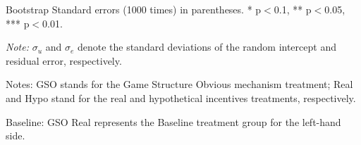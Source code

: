 \documentclass[12pt]{article}
\begin{document}
\begin{table}[H]
\begin{tablenotes}
            \footnotesize
            \item Bootstrap Standard errors (1000 times) in parentheses. * p$<$0.1, ** p$<$0.05, *** p$<$0.01.
            \item \textit{Note:} $\sigma_u$ and $\sigma_e$ denote the standard deviations of the random intercept and residual error, respectively.
            \item Notes: GSO stands for the Game Structure Obvious mechanism treatment; Real and Hypo stand for the real and hypothetical incentives treatments, respectively.
           \item Baseline: GSO Real represents the Baseline treatment group for the left-hand side.
        \end{tablenotes}
\end{table}





\clearpage
\end{document}
